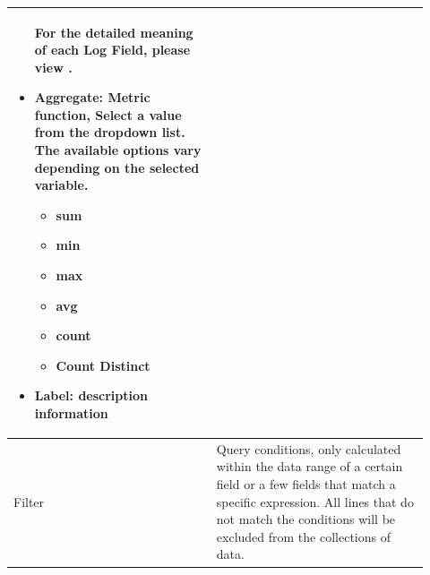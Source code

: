 \begin{description}
\begin{longtable}{p{}|p{}}
\begin{itemize}
                                    For the detailed meaning of each Log Field, please view \textbf{\hyperlink{link:Appendix B Log Fields Description}{\color{linkblue}{Appendix B Log Fields Description}}}.
                                    \item Aggregate: Metric function, Select a value from the dropdown list. The available options vary depending on the selected variable.
                                    \begin{itemize}
                                        \item sum \item min  \item max \item avg \item count \item Count Distinct
                                    \end{itemize}
                                    \item Label: description information
                                \end{itemize} \\\hline 
                Filter & Query conditions, only calculated within the data range of a certain field or a few fields that match a specific expression. All lines that do not match the conditions will be excluded from the collections of data.
                

\end{longtable}
\end{description}

